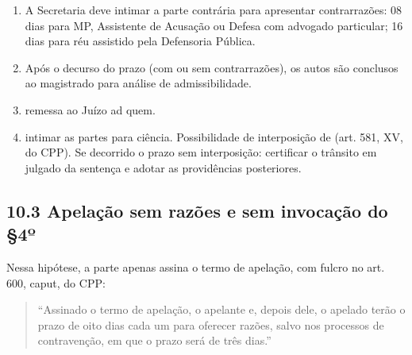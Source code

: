 \documentclass[letterpaper,10pt,brazil]{sphinxmanual}
\begin{document}
\sphinxAtStartPar
{}
\begin{enumerate}
%
\item {} 
\sphinxAtStartPar
A Secretaria deve intimar a parte contrária para apresentar contrarrazões:
\sphinxhyphen{} 08 dias para MP, Assistente de Acusação ou Defesa com advogado particular;
\sphinxhyphen{} 16 dias para réu assistido pela Defensoria Pública.

\item {} 
\sphinxAtStartPar
Após o decurso do prazo (com ou sem contrarrazões), os autos são conclusos ao magistrado para análise de admissibilidade.

\item {} 
\sphinxAtStartPar
{} remessa ao Juízo ad quem.

\item {} 
\sphinxAtStartPar
{} intimar as partes para ciência. Possibilidade de interposição de  (art. 581, XV, do CPP).
\sphinxhyphen{} Se decorrido o prazo sem interposição: certificar o trânsito em julgado da sentença e adotar as providências posteriores.

\end{enumerate}


\subsection{10.3 \textendash{} Apelação sem razões e sem invocação do \S{}4º}
\label{\detokenize{11decisao_recebimento_apelacao:apelacao-sem-razoes-e-sem-invocacao-do-4o}}
\sphinxAtStartPar
Nessa hipótese, a parte apenas assina o termo de apelação, com fulcro no art. 600, caput, do CPP:
\begin{quote}

\sphinxAtStartPar
“Assinado o termo de apelação, o apelante e, depois dele, o apelado terão o prazo de oito dias cada um para oferecer razões, salvo nos processos de contravenção, em que o prazo será de três dias.”
\end{quote}
\end{document}

